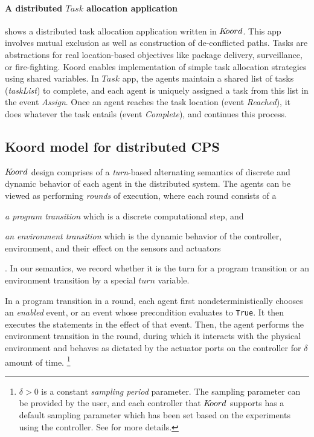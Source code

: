 \paragraph* {A distributed $\mathit{Task}$ allocation application}  shows a distributed task allocation application written in $K\kern-2pt oord$. This app involves mutual exclusion as well as construction of de-conflicted  paths. Tasks are abstractions for real location-based objectives like package delivery, surveillance, or fire-fighting.  Koord enables implementation of simple task allocation strategies using shared variables. In $\mathit{Task}$ app, the agents maintain a shared list of tasks ({\em taskList}) to complete, and each agent is uniquely assigned a task from this list in the event {\em Assign}. Once an agent reaches the task location (event {\em Reached}), it does whatever the task entails (event {\em Complete}), and continues this process.

\subsection{Koord model for distributed CPS}
$K\kern-2pt oord$ design comprises of a \emph{turn}-based alternating semantics of discrete and dynamic behavior of each agent in the distributed system. The agents can be viewed as performing \emph{rounds} of execution, where each round consists of a \begin{inparaenum} 
\item \emph{a program transition} which is a discrete computational step, and 
\item \item \emph{an environment transition} which is the dynamic behavior of the controller, environment, and their effect on the sensors and actuators
\end{inparaenum}. 
In our semantics, we record whether it is the turn for a program transition or an environment transition  by a special $\mathit{turn}$ variable.  

In a program transition in a round, each agent first nondeterministically chooses an \emph{enabled} event, or an event whose precondition evaluates to \verb|True|. It then executes the statements in the effect of that event. %
Then, the agent performs the environment transition in the round, during which it interacts with the physical environment and behaves as dictated by the actuator ports on the controller for $\delta$ amount of time.  \footnote{ $\delta>0$ is a constant \emph{sampling period} parameter. The sampling parameter can be provided by the user, and each controller that $K\kern-2pt oord$ supports has a default sampling parameter which has been set based on the experiments using the controller. See  for more details.}  %

